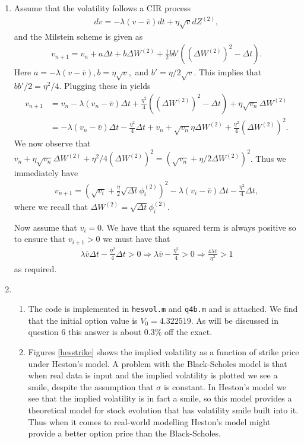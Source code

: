 \documentclass[10pt,english]{article}
\theoremstyle{plain}
\begin{document}
\begin{enumerate}
\item Assume that the volatility follows a CIR process 
\begin{align*}
dv = -\lambda (v-\bar{v})dt + \eta \sqrt{v}dZ^{(2)},
\end{align*}
and the Milstein scheme is given as
\begin{align*}
v_{n+1} = v_{n} + a\Delta t + b \Delta W^{(2)} + \frac{1}{2}bb'((\Delta W^{(2)})^{2}-\Delta t).
\end{align*}
Here $a=-\lambda(v-\bar{v}),b=\eta \sqrt{v},$ and $b'=\eta/2\sqrt{v}$. This implies that $bb'/2 = \eta^{2}/4$. Plugging these in yields
\begin{align*}
v_{n+1} &= v_{n}-\lambda(v_{n}-\bar{v})\Delta t + \frac{\eta^{2}}{4}((\Delta W^{(2)})^{2}-\Delta t) + \eta \sqrt{v_{n}}\Delta W^{(2)}\\
&= -\lambda(v_{n}-\bar{v})\Delta t - \frac{\eta^{2}}{4}\Delta t + v_{n} + \sqrt{v_{n}}\eta \Delta W^{(2)}+ \frac{\eta^{2}}{4}(\Delta W^{(2)})^{2}.
\end{align*}
We now observe that $v_{n}+\eta\sqrt{v_{n}}\Delta W^{(2)} + \eta^{2}/4 (\Delta W^{(2)})^{2} = (\sqrt{v_{n}}+\eta/2 \Delta W^{(2)})^{2}$. Thus we immediately have
\begin{align*}
v_{n+1} = \left(\sqrt{v_{i}}+\frac{\eta}{2}\sqrt{\Delta t}\phi_{i}^{(2)}\right)^{2} - \lambda(v_{i}-\bar{v})\Delta t - \frac{\eta^{2}}{4}\Delta t,
\end{align*}
where we recall that $\Delta W^{(2)} = \sqrt{\Delta t}\phi^{(2)}_{i}$.

Now assume that $v_{i}=0$. We have that the squared term is always positive so to ensure that $v_{i+1}>0$ we must have that
\begin{align*}
\lambda\bar{v}\Delta t -\frac{\eta^{2}}{4}\Delta t > 0 \Rightarrow \lambda \bar{v}-\frac{\eta^{2}}{4} > 0\Rightarrow \frac{4\lambda\bar{v}}{\eta^{2}}>1
\end{align*}
as required.
\item
\begin{enumerate}
\item The code is implemented in \texttt{hesvol.m} and \texttt{q4b.m} and is attached. We find that the initial option value is $V_{0}=4.322519$. As will be discussed in question 6 this answer is about $0.3\%$ off the exact.

\item Figures \ref{hesstrike} shows the implied volatility as a function of strike price under Heston's model. A problem with the Black-Scholes model is that when real data is input and the implied volatility is plotted we see a smile, despite the assumption that $\sigma$ is constant. In Heston's model we see that the implied volatility is in fact a smile, so this model provides a theoretical model for stock evolution that has volatility smile built into it. Thus when it comes to real-world modelling Heston's model might provide a better option price than the Black-Scholes.


\end{enumerate}
\end{enumerate}
\end{document}
